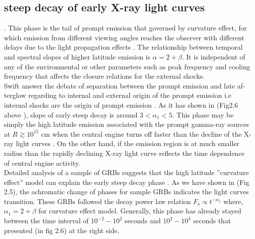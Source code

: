 \subsection{steep decay of early X-ray light curves}.
This phase is the tail of prompt emission that governed by curvature
effect, for which emission from different viewing angles reaches the observer with
different delays due to the light propagation effects \citep{33}. The relationship between temporal and spectral slopes of higher latitude emission is $\alpha  = 2 + \beta $. It is independent of any of the environmental or other parameters such as peak frequency and cooling frequency that affects the closure relations for the external shocks.\\
Swift answer the debate of separation between the prompt emission and late af-
terglow regarding to internal and external origin of the prompt emission i.e internal
shocks are the origin of prompt emission \citep{33}. As it has shown in (Fig2.6 above ), slope of early steep decay is around $3 < \alpha_{1} < 5$.
This phase may be simply the high latitude emission associated with the prompt
gamma-ray sources at $ R \gtrsim 10^{15} $ cm when the central engine turns off faster than the decline of the X-ray light curves . On the other hand, if the emission region is at much smaller radius than the rapidly declining X-ray light curve reflects the time dependence of central engine activity\citep{36}.\\
Detailed analysis of a sample of GRBs suggests that the high latitude ”curvature
effect” model can explain the early steep decay phase \citep{37}. As we have shown in
(Fig 2.5), the achromatic change of phases for sample GRBs indicates the light
curves transition. These GRBs followed the decay power law relation $ F_{\nu}\propto  t^{-\alpha_{1}} $ where, $ \alpha_{1}  = 2 + \beta $ for curvature effect model. Generally, this phase has already stayed between the time interval of $ 10^{-2}  - 10^{2} $ seconds and $ 10^{2} - 10^{3} $ seconds that  presented (in fig 2.6) at the right side.\\\ 
